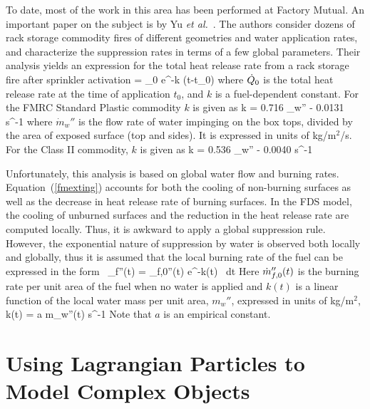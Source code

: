 To date, most of the work in this area has been
performed at Factory Mutual. An important paper on the subject is
by Yu {\em et al.}~\cite{Yu:1}. The authors consider dozens of
rack storage commodity fires of different geometries and water
application rates, and characterize the suppression rates in terms of
a few global parameters. Their analysis yields an
expression for the total heat release rate from a rack storage fire
after sprinkler activation
\be \dQ = \dQ_0 \; e^{-k (t-t_0)}  \label{fmexting} \ee
where $\dot{Q}_0$ is the total heat release rate at the time of application
$t_0$, and $k$ is a fuel-dependent constant.
For the FMRC Standard Plastic commodity $k$ is given as
\be k = 0.716 \; _w'' - 0.0131 \quad  \hbox{s}^{-1} \ee
where $\dot{m}_w''$ is the flow rate of water impinging on the
box tops, divided by the area of exposed surface (top and sides). It is
expressed in units of kg/m$^2$/s. For the Class II commodity, $k$ is
given as
\be k = 0.536 \; _w'' - 0.0040 \quad  \hbox{s}^{-1} \ee

Unfortunately, this analysis is based on global water flow and
burning rates. Equation~(\ref{fmexting})
accounts for both the cooling of non-burning surfaces as well as the
decrease in heat release rate of burning surfaces. In the FDS model,
the cooling of unburned surfaces and the reduction in the heat
release rate are computed locally. Thus, it is awkward to apply a
global suppression rule.
However, the exponential nature of suppression by water is observed
both locally and globally, thus it is assumed that the local burning rate
of the fuel can be expressed in the form~\cite{Hamins:1,Hamins:IAFSS2002}
\be \dm_f''(t) = \dm_{f,0}''(t) \; e^{-\int k(t) \, dt}
\label{nistexting} \ee
Here $\dot{m}_{f,0}''(t)$ is the burning rate per unit area of the fuel
when no water is applied and $k(t)$ is a linear function of the local water
mass per unit area, $m_w''$, expressed in units of kg/m$^2$,
\be k(t) = a \; m_w''(t) \quad   \hbox{s}^{-1} \ee
Note that $a$ is an empirical constant.


\section{Using Lagrangian Particles to Model Complex Objects}

